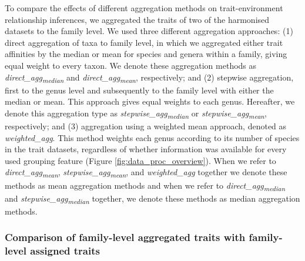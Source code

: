 \documentclass[12pt]{article}
\begin{document}
To compare the effects of different aggregation methods on trait-environment relationship inferences, we aggregated the traits of two of the harmonised datasets to the family level. We used three different aggregation approaches: (1) direct aggregation of taxa to family level, in which we aggregated either trait affinities by the median or mean for species and genera within a family, giving equal weight to every taxon. We denote these aggregation methods as \textit{direct\_agg\textsubscript{median}} and \textit{direct\_agg\textsubscript{mean}}, respectively; and (2) stepwise aggregation, first to the genus level and subsequently to the family level with either the median or mean. This approach gives equal weights to each genus. Hereafter, we denote this aggregation type as \textit{stepwise\_agg\textsubscript{median}} or \textit{stepwise\_agg\textsubscript{mean}}, respectively; and (3) aggregation using a weighted mean approach, denoted as \textit{weighted\_agg}. This method weights each genus according to its number of species in the trait datasets, regardless of whether information was available for every used grouping feature (Figure \ref{fig:data_proc_overview}). When we refer to \textit{direct\_agg\textsubscript{mean}}, \textit{stepwise\_agg\textsubscript{mean}}, and \textit{weighted\_agg} together we denote these methods as mean aggregation methods and when we refer to \textit{direct\_agg\textsubscript{median}} and \textit{stepwise\_agg\textsubscript{median}} together, we denote these methods as median aggregation methods.


\subsubsection*{Comparison of family-level aggregated traits with family-level assigned traits}
\end{document}
